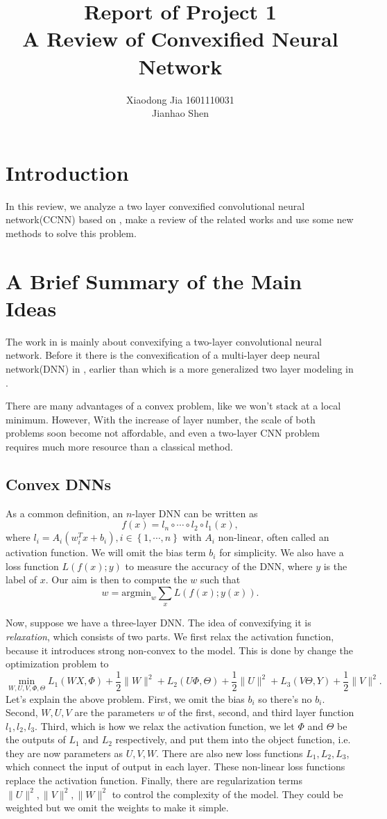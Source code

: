 \documentclass{article}
\title{Report of Project 1\\A Review of Convexified Neural Network}
\author{Xiaodong Jia 1601110031\\Jianhao Shen}
\begin{document}
\maketitle

\tableofcontents
\newpage

\section{Introduction}
In this review, we analyze a two layer convexified convolutional neural network(CCNN) based on \cite{zhang2016convexified}, make a review of the related works and use some new methods to solve this problem.
\section{A Brief Summary of the Main Ideas}
The work in \cite{zhang2016convexified} is mainly about convexifying a two-layer convolutional neural network. Before it there is the convexification of a multi-layer deep neural network(DNN) in \cite{aslan2014convex}, earlier than which is a more generalized two layer modeling in \cite{aslan2013convex}.

There are many advantages of a convex problem, like we won't stack at a local minimum. However, With the increase of layer number, the scale of both problems soon become not affordable, and even a two-layer CNN problem requires much more resource than a classical method.
\subsection{Convex DNNs}
As a common definition, an $n$-layer DNN can be written as \[f(x)=l_n\circ\cdots\circ l_2\circ l_1(x),\] where $l_i=A_i(w_i^Tx+b_i),i\in\left\lbrace 1,\cdots,n\right\rbrace $ with $A_i$ non-linear, often called an activation function. We will omit the bias term $b_i$ for simplicity. We also have a loss function $L(f(x);y)$ to measure the accuracy of the DNN, where $y$ is the label of $x$. Our aim is then to compute the $w$ such that
\[w=\text{argmin}_{w}\sum_{x}L(f(x);y(x)).\]

Now, suppose we have a three-layer DNN. The idea of convexifying it is \emph{relaxation}, which consists of two parts. We first relax the activation function, because it introduces strong non-convex to the model. This is done by change the optimization problem to
\[\min_{W,U,V,\Phi,\Theta}L_1(WX,\Phi)+\frac{1}{2}\|W\|^2+L_2(U\Phi,\Theta)+\frac{1}{2}\|U\|^2+L_3(V\Theta,Y)+\frac{1}{2}\|V\|^2.\]
Let's explain the above problem. First, we omit the bias $b_i$ so there's no $b_i$. Second, $W,U,V$ are the parameters $w$ of the first, second, and third layer function $l_1,l_2,l_3$. Third, which is how we relax the activation function, we let $\Phi$ and $\Theta$ be the outputs of $L_1$ and $L_2$ respectively, and put them into the object function, i.e. they are now parameters as $U,V,W$. There are also new loss functions $L_1,L_2,L_3$, which connect the input of output in each layer. These non-linear loss functions replace the activation function. Finally, there are regularization terms $\|U\|^2,\|V\|^2,\|W\|^2$ to control the complexity of the model. They could be weighted but we omit the weights to make it simple.
\end{document}
